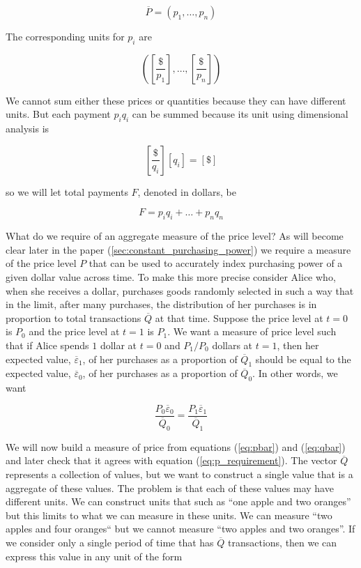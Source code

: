 \begin{equation} \label{eq:pbar}
    \overline P = \left( p_1, \dots, p_n \right)
\end{equation}

The corresponding units for $p_i$ are

\[ \left( \left[ \frac {\$} {p_1} \right], \dots, \left[ \frac {\$} {p_n} \right] \right) \]

We cannot sum either these prices or quantities because they can have different units. But each
payment $p_i q_i$ can be summed because its unit using dimensional analysis is

\[ \left[ \frac {\$} {q_i} \right] \left[ q_i \right] = \left[ \$ \right] \]

so we will let total payments $F$, denoted in dollars, be

\[ F = p_i q_i + \dots + p_n q_n \]

What do we require of an aggregate measure of the price level? As will become clear later in the
paper (\ref{sec:constant_purchasing_power}) we require a measure of the price level $P$ that can be
used to accurately index purchasing power of a given dollar value across time. To make this more
precise consider Alice who, when she receives a dollar, purchases goods randomly selected in such a
way that in the limit, after many purchases, the distribution of her purchases is in proportion to
total transactions $\overline Q$ at that time. Suppose the price level at $t=0$ is $P_0$ and the
price level at $t=1$ is $P_1$. We want a measure of price level such that if Alice spends $1$ dollar
at $t=0$ and $P_1 / P_0$ dollars at $t=1$, then her expected value, $\overline \varepsilon_1$, of her purchases as
a proportion of $\overline Q_1$ should be equal to the expected value, $\overline \varepsilon_0$, of her
purchases as a proportion of $\overline Q_0$. In other words, we want

\begin{equation} \label{eq:p_requirement}
    \frac {P_0 \overline \varepsilon_0} {\overline Q_0} = \frac {P_1 \overline \varepsilon_1} {\overline Q_1}
\end{equation}

We will now build a measure of price from equations (\ref{eq:pbar}) and (\ref{eq:qbar}) and later
check that it agrees with equation (\ref{eq:p_requirement}). The vector $\overline Q$ represents a
collection of values, but we want to construct a single value that is a aggregate of these values.
The problem is that each of these values may have different units. We can construct units that such
as ``one apple and two oranges'' but this limits to what we can measure in these units. We can
measure ``two apples and four oranges`` but we cannot measure ``two apples and two oranges''. If we
consider only a single period of time that has $\overline Q$ transactions, then we can express
this value in any unit of the form

